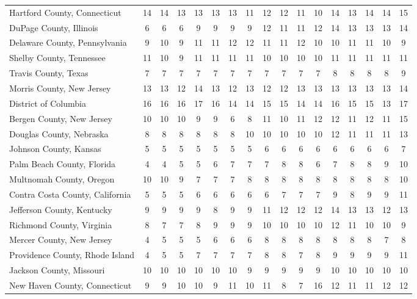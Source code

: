 \begin{landscape}
\begin{longtable}{lcccccccccccccccc}
		Hartford County, Connecticut & 14 & 14 & 13 & 13 & 13 & 13 & 11 & 12 & 12 & 11 & 10 & 14 & 13 & 14 & 14 & 15 \\
		DuPage County, Illinois & 6 & 6 & 6 & 9 & 9 & 9 & 9 & 12 & 11 & 11 & 12 & 14 & 13 & 13 & 13 & 14 \\
		Delaware County, Pennsylvania & 9 & 10 & 9 & 11 & 11 & 12 & 12 & 11 & 11 & 12 & 10 & 10 & 11 & 11 & 10 & 9 \\
		Shelby County, Tennessee & 11 & 10 & 9 & 11 & 11 & 11 & 11 & 10 & 10 & 10 & 10 & 11 & 11 & 11 & 11 & 11 \\
		Travis County, Texas & 7 & 7 & 7 & 7 & 7 & 7 & 7 & 7 & 7 & 7 & 7 & 8 & 8 & 8 & 8 & 9 \\
		Morris County, New Jersey & 13 & 13 & 12 & 14 & 13 & 12 & 13 & 12 & 12 & 13 & 13 & 13 & 13 & 13 & 13 & 14 \\
		District of Columbia & 16 & 16 & 16 & 17 & 16 & 14 & 14 & 15 & 15 & 14 & 14 & 16 & 15 & 15 & 13 & 17 \\
		Bergen County, New Jersey & 10 & 10 & 10 & 9 & 9 & 6 & 8 & 11 & 10 & 11 & 12 & 12 & 11 & 12 & 11 & 15 \\
		Douglas County, Nebraska & 8 & 8 & 8 & 8 & 8 & 8 & 10 & 10 & 10 & 10 & 10 & 12 & 11 & 11 & 11 & 13 \\
		Johnson County, Kansas & 5 & 5 & 5 & 5 & 5 & 5 & 5 & 6 & 6 & 6 & 6 & 6 & 6 & 6 & 6 & 7 \\
		Palm Beach County, Florida & 4 & 4 & 5 & 5 & 6 & 7 & 7 & 7 & 8 & 8 & 6 & 7 & 8 & 8 & 9 & 10 \\
		Multnomah County, Oregon & 10 & 10 & 9 & 7 & 7 & 7 & 8 & 8 & 8 & 8 & 8 & 8 & 8 & 8 & 8 & 10 \\
		Contra Costa County, California & 5 & 5 & 5 & 6 & 6 & 6 & 6 & 6 & 7 & 7 & 7 & 9 & 8 & 9 & 9 & 11 \\
		Jefferson County, Kentucky & 9 & 9 & 9 & 9 & 8 & 9 & 9 & 11 & 12 & 12 & 12 & 14 & 13 & 13 & 12 & 13 \\
		Richmond County, Virginia & 8 & 7 & 7 & 8 & 9 & 9 & 9 & 10 & 10 & 10 & 10 & 12 & 11 & 10 & 10 & 9 \\
		Mercer County, New Jersey & 4 & 5 & 5 & 5 & 6 & 6 & 6 & 8 & 8 & 8 & 8 & 8 & 8 & 8 & 7 & 8 \\
		Providence County, Rhode Island & 4 & 5 & 5 & 7 & 7 & 7 & 7 & 8 & 8 & 7 & 8 & 9 & 9 & 9 & 9 & 11 \\
		Jackson County, Missouri & 10 & 10 & 10 & 10 & 10 & 10 & 9 & 9 & 9 & 9 & 9 & 10 & 10 & 10 & 10 & 10 \\
		New Haven County, Connecticut & 9 & 9 & 10 & 10 & 9 & 11 & 10 & 11 & 8 & 7 & 16 & 12 & 11 & 11 & 12 & 12 \\

\end{longtable}
\end{landscape}
